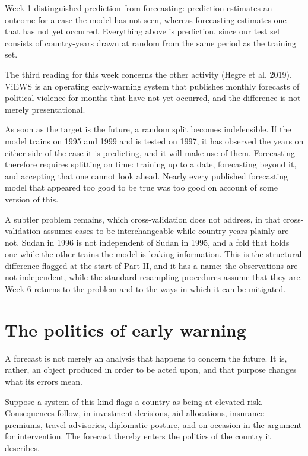 \documentclass[
  a4paper,
]{scrbook}
\begin{document}
Week 1 distinguished prediction from forecasting: prediction estimates
an outcome for a case the model has not seen, whereas forecasting
estimates one that has not yet occurred. Everything above is prediction,
since our test set consists of country-years drawn at random from the
same period as the training set.

The third reading for this week concerns the other activity ({Hegre et
al.} 2019). ViEWS is an operating early-warning system that publishes
monthly forecasts of political violence for months that have not yet
occurred, and the difference is not merely presentational.

As soon as the target is the future, a random split becomes
indefensible. If the model trains on 1995 and 1999 and is tested on
1997, it has observed the years on either side of the case it is
predicting, and it will make use of them. Forecasting therefore requires
splitting on time: training up to a date, forecasting beyond it, and
accepting that one cannot look ahead. Nearly every published forecasting
model that appeared too good to be true was too good on account of some
version of this.

A subtler problem remains, which cross-validation does not address, in
that cross-validation assumes cases to be interchangeable while
country-years plainly are not. Sudan in 1996 is not independent of Sudan
in 1995, and a fold that holds one while the other trains the model is
leaking information. This is the structural difference flagged at the
start of Part II, and it has a name: the observations are not
independent, while the standard resampling procedures assume that they
are. Week 6 returns to the problem and to the ways in which it can be
mitigated.

\section{The politics of early
warning}\label{the-politics-of-early-warning}

A forecast is not merely an analysis that happens to concern the future.
It is, rather, an object produced in order to be acted upon, and that
purpose changes what its errors mean.

Suppose a system of this kind flags a country as being at elevated risk.
Consequences follow, in investment decisions, aid allocations, insurance
premiums, travel advisories, diplomatic posture, and on occasion in the
argument for intervention. The forecast thereby enters the politics of
the country it describes.
\end{document}

